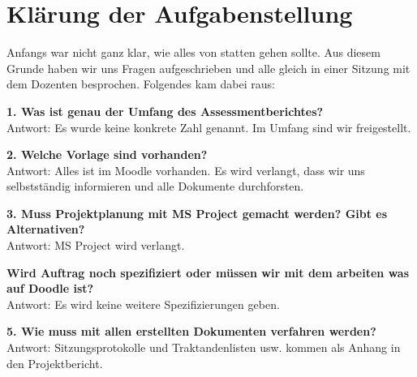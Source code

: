 \chapter{Klärung der Aufgabenstellung}

Anfangs war nicht ganz klar, wie alles von statten gehen sollte. Aus diesem Grunde haben wir uns Fragen aufgeschrieben und alle gleich in einer Sitzung mit dem Dozenten besprochen. Folgendes kam dabei raus:

\textbf{1. Was ist genau der Umfang des Assessmentberichtes?} \\
Antwort: Es wurde keine konkrete Zahl genannt. Im Umfang sind wir freigestellt.

\textbf{2. Welche Vorlage sind vorhanden?} \\
Antwort: Alles ist im Moodle vorhanden. Es wird verlangt, dass wir uns selbstständig informieren und alle Dokumente durchforsten.

\textbf{3. Muss Projektplanung mit MS Project gemacht werden? Gibt es Alternativen?}\\
Antwort: MS Project wird verlangt.

\textbf{Wird Auftrag noch spezifiziert oder müssen wir mit dem arbeiten was auf Doodle ist?} \\
Antwort: Es wird keine weitere Spezifizierungen geben.

\textbf{5. Wie muss mit allen erstellten Dokumenten verfahren werden?} \\
Antwort: Sitzungsprotokolle und Traktandenlisten usw. kommen als Anhang in den Projektbericht.

